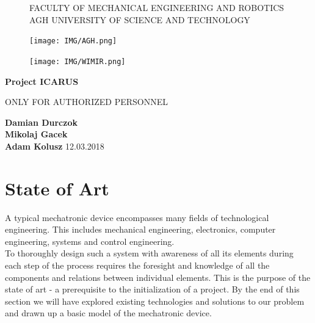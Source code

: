 \documentclass{article}
\begin{document}
\begin{titlepage}
    \begin{center}
        
	\begin{figure}
		\centering
        FACULTY OF MECHANICAL ENGINEERING AND ROBOTICS\\
        AGH UNIVERSITY OF SCIENCE AND TECHNOLOGY\\
        \vspace{0.2cm}
    	\begin{minipage}[b]{0.4\textwidth}
    	    \centering
    		\texttt{[image: IMG/AGH.png]}
    	\end{minipage}
    	\hfill
    	\begin{minipage}[b]{0.4\textwidth}
	    	\centering
    		\texttt{[image: IMG/WIMIR.png]}
		\end{minipage}
		\vspace{1cm}
    \end{figure}

    \Huge \textbf{Project ICARUS}
        
    \vspace{0.8cm}
    \LARGE 
    \color{red} ONLY FOR AUTHORIZED PERSONNEL
    \color{black}
            
    \vspace{0.8cm}       
    \textbf{Damian Durczok\\Mikolaj Gacek\\Adam Kolusz}        
    \vfill       
    \vspace{0.8cm}    
    12.03.2018
        
    \end{center}
\end{titlepage}

\tableofcontents
\break

\section{State of Art}
A typical mechatronic device encompasses many fields of technological engineering. This includes mechanical engineering, electronics, computer engineering, systems and control engineering.\\[12pt] 
\indent To thoroughly design such a system with awareness of all its elements during each step of the process requires the foresight and knowledge of all the components and relations between individual elements. This is the purpose of the state of art - a prerequisite to the initialization of a project. By the end of this section we will have explored existing technologies and solutions to our problem and drawn up a basic model of the mechatronic device.
\end{document}
